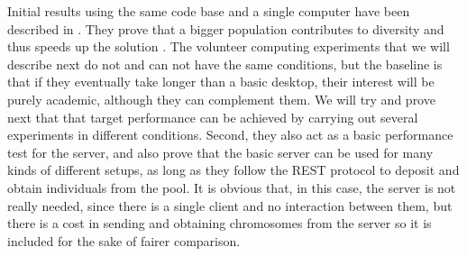 \documentclass[journal,onecolumn]{IEEEtran}
\begin{document}
Initial results using the same code base and a single computer have
been described in \cite{2016arXiv160101607M}. They prove that a bigger population
contributes to diversity and thus speeds up the solution
\cite{DBLP:conf/lion/LaredoDFGB13}. The volunteer computing 
experiments that we will describe next do not and can not have the
same conditions, but
the baseline is that if they eventually take longer than a basic
desktop, their interest will be purely academic, although they can
complement them. We will try and
prove next that that target performance can be achieved by carrying
out several experiments in different conditions. Second, they also act
as a basic performance test for the server, and also prove that the
basic server can be used for many kinds of different setups, as long
as they follow the REST protocol to deposit and obtain individuals
from the pool. It is obvious that, in this case, the server is not
really needed, since there is a single client and no interaction
between them, but there is a cost in sending and obtaining chromosomes
from the server so it is included for the sake of fairer comparison.
\end{document}
